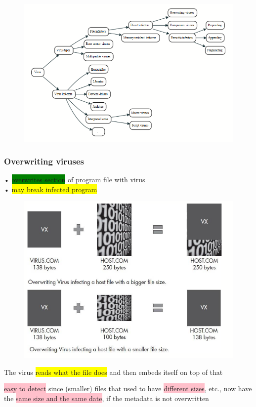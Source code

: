 \documentclass[]{project_plan}
\begin{document}
\begin{figure}[H]
  \centering
  \includegraphics*[width=\linewidth]{virus_classification.png}
\end{figure}

\newpage

\subsubsection{Overwriting viruses}

• \colorbox{green}{overwrites section} of program file with virus\\
• \colorbox{yellow}{may break infected program}

\begin{figure}[H]
  \centering
  \includegraphics*[width=.7\linewidth]{overwriting_viruses.png}
\end{figure}

The virus \colorbox{yellow}{reads what the file does} and then embeds itself on top of that

\colorbox{pink}{easy to detect} since (smaller) files that used to have \colorbox{pink}{different sizes}, etc., now have the \colorbox{pink}{same size and the same date}, if the metadata is not overwritten
\end{document}
